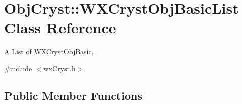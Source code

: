 \hypertarget{class_obj_cryst_1_1_w_x_cryst_obj_basic_list}{}\section{Obj\+Cryst\+::W\+X\+Cryst\+Obj\+Basic\+List Class Reference}
\label{class_obj_cryst_1_1_w_x_cryst_obj_basic_list}


A List of \mbox{\hyperlink{class_obj_cryst_1_1_w_x_cryst_obj_basic}{W\+X\+Cryst\+Obj\+Basic}}.  




{\ttfamily \#include $<$wx\+Cryst.\+h$>$}

\subsection*{Public Member Functions}
